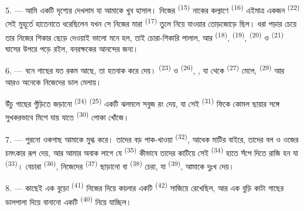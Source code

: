 5. --- আমি একটি দৃশ্যের  দেখলাম যা আমাকে খুব হাসাল। নিজের
 \textsuperscript{(15)} নাকের কল্যাণে 
\textsuperscript{(16)} এইমাত্র একজন  \textsuperscript{(22)}
সেই মুহূর্তে হাতেনাতে ধরেছিলেন যখন সে নিজের মারা 
\textsuperscript{(17)} তুলে নিয়ে যাওয়ার তোড়জোড়ে ছিল। ধরা পড়ার চেয়ে তার
নিজের শিকার ছেড়ে দেওয়াই ভালো মনে হল, তাই চোরা-শিকারি পালাল, আর
 \textsuperscript{(18)},  \textsuperscript{(19)},
 \textsuperscript{(20)} ও  \textsuperscript{(21)}
ঘাসের উপরে পড়ে রইল, বনরক্ষকের আনন্দের জন্য।

6. --- বনে গাছের যত রকম আছে, তা হতবাক করে দেয়। 
\textsuperscript{(23)} ও  \textsuperscript{(26)}, ,
যা থেকে  \textsuperscript{(27)} মেলে, 
\textsuperscript{(29)} আর আরও অনেকে নিজেদের ডাল মেলায়।

উঁচু গাছের গুঁড়িতে জড়ানো  \textsuperscript{(24)}  \textsuperscript{(25)} একটি ঝলমলে সবুজ রং দেয়, যা সেই 
\textsuperscript{(31)} ফিকে কোমল ছায়ার সঙ্গে সুখকরভাবে মিশে যায় যাতে
 \textsuperscript{(30)} পোকা খোঁজে।

\VUsaut{3.0mm}
\VUsaut{3.0mm}

7. --- পুরনো ওকগাছ আমাকে মুগ্ধ করে। তাদের বড় পাক-খাওয়া 
\textsuperscript{(32)}, আধেক মাটির বাইরে, তাদের বল ও ওজের চমৎকার রূপ দেয়, আর
আমার অবাক লাগে যে  \textsuperscript{(35)} কীভাবে তাদের কাটিয়ে সেই
 \textsuperscript{(34)} হাতে সঁপে দিতে রাজি হন যা
 \textsuperscript{(33)}। বেচারা 
\textsuperscript{(36)}, নিজেদের  \textsuperscript{(37)} ছাড়ানো বা
 \textsuperscript{(38)} চেরা, যা 
\textsuperscript{(39)}, আমাকে দুঃখ দেয়।

8. --- কাছেই এক বুড়ো  \textsuperscript{(41)} নিজের
 দিয়ে কয়লার একটি  \textsuperscript{(42)} সাজিয়ে
রেখেছিল, আর এক বুড়ি কাটা গাছের ডালপালা দিয়ে বানানো 
একটি  \textsuperscript{(40)} নিয়ে যাচ্ছিল।

\VUsaut{3.0mm}
\VUsaut{3.0mm}

